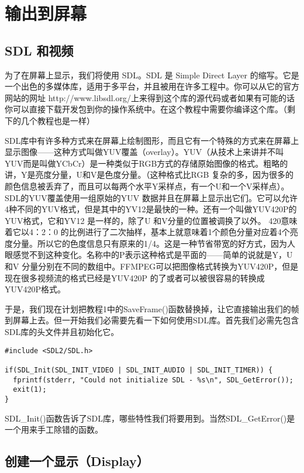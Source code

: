 ﻿\chapter{输出到屏幕}
\label{ch2}
\section{SDL 和视频}
为了在屏幕上显示，我们将使用 SDL。SDL 是 Simple Direct Layer 的缩写。它是一个出色的多媒体库，适用于多平台，并且被用在许多工程中。你可以从它的官方网站的网址 http://www.libsdl.org/上来得到这个库的源代码或者如果有可能的话你可以直接下载开发包到你的操作系统中。在这个教程中需要你编译这个库。（剩下的几个教程也是一样）

SDL库中有许多种方式来在屏幕上绘制图形，而且它有一个特殊的方式来在屏幕上显示图像——这种方式叫做YUV覆盖（overlay）。YUV（从技术上来讲并不叫YUV而是叫做YCbCr）是一种类似于RGB方式的存储原始图像的格式。粗略的讲，Y是亮度分量，U和V是色度分量。（这种格式比RGB 复杂的多，因为很多的颜色信息被丢弃了，而且可以每两个水平Y采样点，有一个U和一个V采样点）。SDL的YUV覆盖使用一组原始的YUV 数据并且在屏幕上显示出它们。它可以允许4种不同的YUV格式，但是其中的YV12是最快的一种。还有一个叫做YUV420P的YUV格式，它和YV12 是一样的，除了U 和V分量的位置被调换了以外。 420意味着它以4：2：0 的比例进行了二次抽样，基本上就意味着1个颜色分量对应着4个亮度分量。所以它的色度信息只有原来的1/4。这是一种节省带宽的好方式，因为人眼感觉不到这种变化。名称中的P表示这种格式是平面的——简单的说就是Y，U和V 分量分别在不同的数组中。FFMPEG可以把图像格式转换为YUV420P，但是现在很多视频流的格式已经是YUV420P 的了或者可以被很容易的转换成YUV420P格式。

于是，我们现在计划把教程1中的SaveFrame()函数替换掉，让它直接输出我们的帧到屏幕上去。但一开始我们必需要先看一下如何使用SDL库。首先我们必需先包含SDL库的头文件并且初始化它。

\begin{lstlisting}
#include <SDL2/SDL.h>

if(SDL_Init(SDL_INIT_VIDEO | SDL_INIT_AUDIO | SDL_INIT_TIMER)) {
  fprintf(stderr, "Could not initialize SDL - %s\n", SDL_GetError());
  exit(1);
}
\end{lstlisting}

SDL_Init()函数告诉了SDL库，哪些特性我们将要用到。当然SDL_GetError()是一个用来手工除错的函数。

\section{创建一个显示（Display）}

